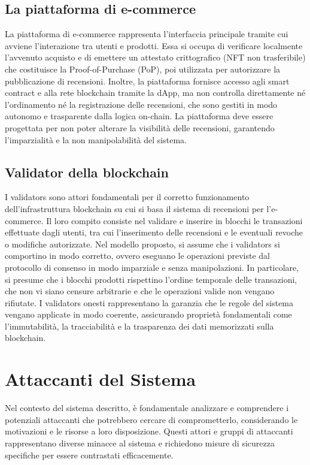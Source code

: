         \subsection{La piattaforma di e-commerce}
           La piattaforma di e-commerce rappresenta l'interfaccia principale tramite cui avviene l'interazione tra utenti e prodotti. Essa si occupa di verificare localmente l'avvenuto acquisto e di emettere un attestato crittografico (NFT non trasferibile) che costituisce la Proof-of-Purchase (PoP), poi utilizzata per autorizzare la pubblicazione di recensioni. Inoltre, la piattaforma fornisce accesso agli smart contract e alla rete blockchain tramite la dApp, ma non controlla direttamente né l'ordinamento né la registrazione delle recensioni, che sono gestiti in modo autonomo e trasparente dalla logica on-chain. La piattaforma deve essere progettata per non poter alterare la visibilità delle recensioni, garantendo l'imparzialità e la non manipolabilità del sistema.

        \subsection{Validator della blockchain}
            I validators sono attori fondamentali per il corretto funzionamento dell'infrastruttura blockchain su cui si basa il sistema di recensioni per l'e-commerce.
            Il loro compito consiste nel validare e inserire in blocchi le transazioni effettuate dagli utenti, tra cui l'inserimento delle recensioni e le eventuali revoche o modifiche autorizzate. 
            Nel modello proposto, si assume che i validators si comportino in modo corretto, ovvero eseguano le operazioni previste dal protocollo di consenso in modo imparziale e senza manipolazioni. In particolare, si presume che i blocchi prodotti rispettino l'ordine temporale delle transazioni, che non vi siano censure arbitrarie e che le operazioni valide non vengano rifiutate. I validators onesti rappresentano la garanzia che le regole del sistema vengano applicate in modo coerente, assicurando proprietà fondamentali come l'immutabilità, la tracciabilità e la trasparenza dei dati memorizzati sulla blockchain.

    \section{Attaccanti del Sistema}
        Nel contesto del sistema descritto, è fondamentale analizzare e comprendere i potenziali attaccanti che potrebbero cercare di comprometterlo, considerando le motivazioni e le risorse a loro disposizione.
        Questi attori e gruppi di attaccanti rappresentano diverse minacce al sistema e richiedono misure di sicurezza specifiche per essere contrastati efficacemente.
    

